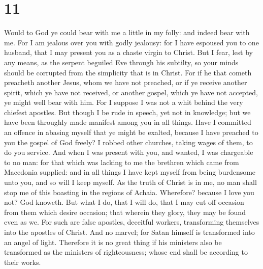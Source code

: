 \hypertarget{section-10}{%
\section{11}\label{section-10}}

 Would to God ye could bear with me a little in my folly:
and indeed bear with me.  For I am jealous over you with
godly jealousy: for I have espoused you to one husband, that I may
present you as a chaste virgin to Christ.  But I fear,
lest by any means, as the serpent beguiled Eve through his subtilty, so
your minds should be corrupted from the simplicity that is in Christ.
 For if he that cometh preacheth another Jesus, whom we
have not preached, or if ye receive another spirit, which ye have not
received, or another gospel, which ye have not accepted, ye might well
bear with him.  For I suppose I was not a whit behind the
very chiefest apostles.  But though I be rude in speech,
yet not in knowledge; but we have been throughly made manifest among you
in all things.  Have I committed an offence in abasing
myself that ye might be exalted, because I have preached to you the
gospel of God freely?  I robbed other churches, taking
wages of them, to do you service.  And when I was present
with you, and wanted, I was chargeable to no man: for that which was
lacking to me the brethren which came from Macedonia supplied: and in
all things I have kept myself from being burdensome unto you, and so
will I keep myself.  As the truth of Christ is in me, no
man shall stop me of this boasting in the regions of Achaia.
 Wherefore? because I love you not? God knoweth.
 But what I do, that I will do, that I may cut off
occasion from them which desire occasion; that wherein they glory, they
may be found even as we.  For such are false apostles,
deceitful workers, transforming themselves into the apostles of Christ.
 And no marvel; for Satan himself is transformed into an
angel of light.  Therefore it is no great thing if his
ministers also be transformed as the ministers of righteousness; whose
end shall be according to their works.

